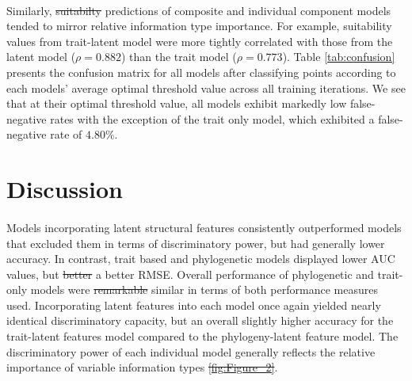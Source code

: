 \documentclass[num-refs]{article}%
\providecommand{\DIFadd}[1]{{\protect\color{blue}\uwave{#1}}} %
\providecommand{\DIFdel}[1]{{\protect\color{red}\sout{#1}}}                      %
\providecommand{\DIFaddbegin}{} %
\providecommand{\DIFaddend}{} %
\providecommand{\DIFdelbegin}{} %
\providecommand{\DIFdelend}{} %
\newcommand{\DIFscaledelfig}{0.5}
\newlength{\DIFdelgraphicswidth} %
\newlength{\DIFdelgraphicsheight} %
\newcommand{\DIFaddincludegraphics}[2][]{{\color{blue}\fbox{\DIFOincludegraphics[#1]{#2}}}} %
\newcommand{\DIFdelincludegraphics}[2][]{%
\sbox{\DIFdelgraphicsbox}{\DIFOincludegraphics[#1]{#2}}%
\settoboxwidth{\DIFdelgraphicswidth}{\DIFdelgraphicsbox} %
\settoboxtotalheight{\DIFdelgraphicsheight}{\DIFdelgraphicsbox} %
\scalebox{\DIFscaledelfig}{%
\parbox[b]{\DIFdelgraphicswidth}{\usebox{\DIFdelgraphicsbox}\\[-\baselineskip] \rule{\DIFdelgraphicswidth}{0em}}\llap{\resizebox{\DIFdelgraphicswidth}{\DIFdelgraphicsheight}{%
\setlength{\unitlength}{\DIFdelgraphicswidth}%
\begin{picture}(1,1)%
\thicklines\linethickness{2pt} %
{\color[rgb]{1,0,0}\put(0,0){\framebox(1,1){}}}%
{\color[rgb]{1,0,0}\put(0,0){\line( 1,1){1}}}%
{\color[rgb]{1,0,0}\put(0,1){\line(1,-1){1}}}%
\end{picture}%
}\hspace*{3pt}}} %
} %
\DeclareRobustCommand{\DIFaddbegin}{\DIFOaddbegin \let\includegraphics\DIFaddincludegraphics} %
\DeclareRobustCommand{\DIFaddend}{\DIFOaddend \let\includegraphics\DIFOincludegraphics} %
\DeclareRobustCommand{\DIFdelbegin}{\DIFOdelbegin \let\includegraphics\DIFdelincludegraphics} %
\DeclareRobustCommand{\DIFdelend}{\DIFOaddend \let\includegraphics\DIFOincludegraphics} %
\begin{document}
\paragraph*{}
Similarly, \DIFdelbegin \DIFdel{suitabilty }\DIFdelend \DIFaddbegin \DIFadd{suitability }\DIFaddend predictions of composite and individual component models tended to mirror relative information type importance. For example, suitability values from trait-latent model were more tightly correlated with those from the latent model ($\rho=0.882$) than the trait model ($\rho=0.773$). Table \ref{tab:confusion} presents the confusion matrix for all models after classifying points according to each models' average optimal threshold value across all training iterations. We see that at their optimal threshold value, all models exhibit markedly low false-negative rates with the exception of the trait only model, which exhibited a false-negative rate of $4.80\%$.








\section*{Discussion}
\paragraph*{}
Models incorporating latent structural features consistently outperformed models that excluded them in terms of discriminatory power, but had generally lower accuracy. In contrast, trait based and phylogenetic models displayed lower AUC values, but \DIFdelbegin \DIFdel{better }\DIFdelend a better RMSE. Overall performance of phylogenetic and trait-only models were \DIFdelbegin \DIFdel{remarkable }\DIFdelend \DIFaddbegin \DIFadd{remarkably }\DIFaddend similar in terms of both performance measures used. Incorporating latent features into each model once again yielded nearly identical discriminatory  capacity, but an overall slightly higher accuracy for the trait-latent features model compared to the phylogeny-latent feature model. The discriminatory power of each individual model generally reflects the relative importance of variable information types \DIFdelbegin \DIFdel{\ref{fig:Figure_2}}\DIFdelend \DIFaddbegin \DIFadd{(\ref{fig:Figure_2})}\DIFaddend . 
\end{document}
